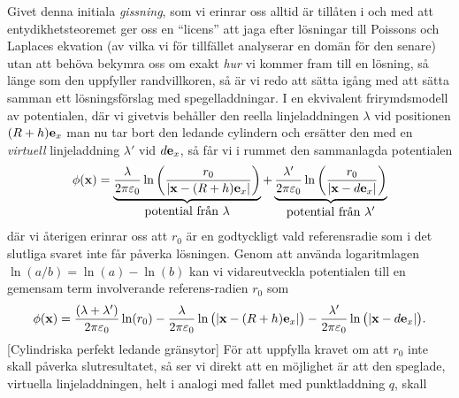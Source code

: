 {Givet denna initiala {\it gissning}, som vi erinrar oss alltid {\"a}r
till{\aa}ten i och med att entydikhetsteoremet ger oss en ``licens'' att jaga
efter l{\"o}sningar till Poissons och Laplaces ekvation (av vilka vi f{\"o}r
tillf{\"a}llet analyserar en dom{\"a}n f{\"o}r den senare) utan att beh{\"o}va
bekymra oss om exakt {\it hur} vi kommer fram till en l{\"o}sning, s{\aa}
l{\"a}nge som den uppfyller randvillkoren, s{\aa} {\"a}r vi redo att s{\"a}tta
ig{\aa}ng med att s{\"a}tta samman ett l{\"o}sningsf{\"o}rslag med
spegelladdningar. I en ekvivalent frirymdsmodell av potentialen, d{\"a}r vi
givetvis beh{\aa}ller den reella linjeladdningen $\lambda$ vid positionen
$(R+h){\bf e}_x$ man nu tar bort den ledande cylindern och ers{\"a}tter den med
en {\it virtuell} linjeladdning $\lambda'$ vid $d{\bf e}_x$, s{\aa} f{\aa}r vi
i rummet den sammanlagda potentialen
$$
  \phi({\bf x})
    =\underbrace{
        {{\lambda}\over{2\pi\varepsilon_0}}
          \ln\bigg({{r_0}\over{|{\bf x}-(R+h){\bf e}_x|}}\bigg)
     }_{\hbox{potential fr{\aa}n $\lambda$}}
    +\underbrace{
        {{\lambda'}\over{2\pi\varepsilon_0}}
          \ln\bigg({{r_0}\over{|{\bf x}-d{\bf e}_x|}}\bigg)
     }_{\hbox{potential fr{\aa}n $\lambda'$}}
$$
d{\"a}r vi {\aa}terigen erinrar oss att $r_0$ {\"a}r en godtyckligt vald
referensradie som i det slutliga svaret inte f{\aa}r p{\aa}verka
l{\"o}sningen.
Genom att anv{\"a}nda logaritmlagen $\ln(a/b)=\ln(a)-\ln(b)$ kan vi
vidareutveckla potentialen till en gemensam term involverande referens-radien
$r_0$ som
$$
  \phi({\bf x})
    ={{(\lambda+\lambda')}\over{2\pi\varepsilon_0}}\ln(r_0)
    -{{\lambda}\over{2\pi\varepsilon_0}}
          \ln\big(|{\bf x}-(R+h){\bf e}_x|\big)
    -{{\lambda'}\over{2\pi\varepsilon_0}}
          \ln\big(|{\bf x}-d{\bf e}_x|\big).
$$
[Cylindriska perfekt ledande gr{\"a}nsytor]
F{\"o}r att uppfylla kravet om att $r_0$ inte skall p{\aa}verka slutresultatet,
s{\aa} ser vi direkt att en m{\"o}jlighet {\"a}r att den speglade, virtuella
linjeladdningen, helt i analogi med fallet med punktladdning $q$, skall
}
